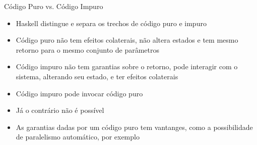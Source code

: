 \begin{frame}[fragile]{Código Puro vs. Código Impuro}

    \begin{itemize}
        \item Haskell distingue e separa os trechos de código puro e impuro

        \item Código puro não tem efeitos colaterais, não altera estados e tem mesmo retorno
            para o mesmo conjunto de parâmetros

        \item Código impuro não tem garantias sobre o retorno, pode interagir com o sistema,
            alterando seu estado, e ter efeitos colaterais

        \item Código impuro pode invocar código puro

        \item Já o contrário não é possível

        \item As garantias dadas por um código puro tem vantanges, como a possibilidade de
            paralelismo automático, por exemplo
    \end{itemize}

\end{frame}
